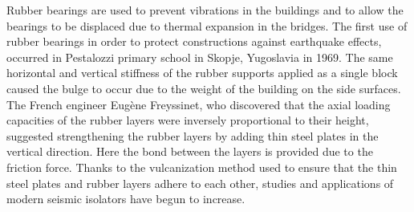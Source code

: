 Rubber bearings are used to prevent vibrations in the buildings and
to allow the bearings to be displaced due to thermal expansion in
the bridges. The first use of rubber bearings in order to protect
constructions against earthquake effects, occurred in Pestalozzi primary
school in Skopje, Yugoslavia in 1969. The same horizontal and vertical
stiffness of the rubber supports applied as a single block caused
the bulge to occur due to the weight of the building on the side surfaces.
The French engineer Eugène Freyssinet, who discovered that the axial
loading capacities of the rubber layers were inversely proportional
to their height, suggested strengthening the rubber layers by adding
thin steel plates in the vertical direction. Here the bond between
the layers is provided due to the friction force. Thanks to the vulcanization
method used to ensure that the thin steel plates and rubber layers
adhere to each other, studies and applications of modern seismic isolators
have begun to increase.